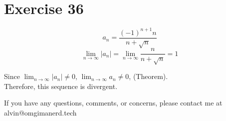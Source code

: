 \documentclass{math}
\begin{document}
\section*{Exercise 36}
\[ a_{n} = \frac{(-1)^{n+1}n}{n+\sqrt{n}} \]
\[ \lim_{n\to\infty}{|a_{n}|} = \lim_{n\to\infty}{\frac{n}{n+\sqrt{n}}} = 1 \]
\begin{center}
  Since \( \lim_{n\to\infty}{|a_{n}|} \neq 0 \),
  \( \lim_{n\to\infty}{a_{n}} \neq 0 \), (Theorem). \\
  Therefore, this sequence is divergent.
\end{center}

\begin{center}
  If you have any questions, comments, or concerns, please contact me at
  alvin@omgimanerd.tech
\end{center}
\end{document}
